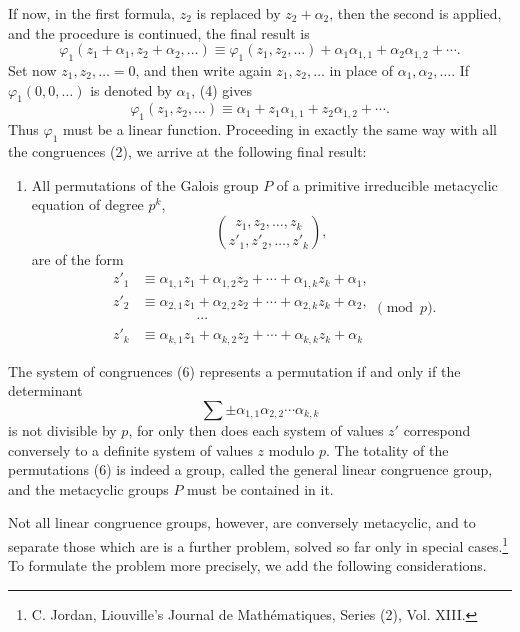 \documentclass[11pt]{article}
\begin{document}
If now, in the first formula, $z_2$ is replaced by $z_2+\alpha_2$, then the second is applied, and the procedure is continued, the final result is
\begin{equation}
 \varphi_1(z_1+\alpha_1,z_2+\alpha_2,\ldots)
 \equiv
 \varphi_1(z_1,z_2,\ldots)+\alpha_1\alpha_{1,1}
      +\alpha_2\alpha_{1,2}+\cdots .
 \tag{4}
\end{equation}
Set now $z_1,z_2,\ldots=0$, and then write again $z_1,z_2,\ldots$ in place of $\alpha_1,\alpha_2,\ldots$. If $\varphi_1(0,0,\ldots)$ is denoted by $\alpha_1$, (4) gives
\begin{equation}
 \varphi_1(z_1,z_2,\ldots)
 \equiv
 \alpha_1+z_1\alpha_{1,1}+z_2\alpha_{1,2}+\cdots.
 \tag{5}
\end{equation}
Thus $\varphi_1$ must be a linear function. Proceeding in exactly the same way with all the congruences (2), we arrive at the following final result:

\begin{enumerate}[label=\Roman*.,leftmargin=2.8em]
\item All permutations of the Galois group $P$ of a primitive irreducible metacyclic equation of degree $p^k$,
\[
 \binom{z_1,z_2,\ldots,z_k}{z'_1,z'_2,\ldots,z'_k},
\]
are of the form
\begin{equation}
\begin{aligned}
 z'_1&\equiv \alpha_{1,1}z_1+\alpha_{1,2}z_2+\cdots+\alpha_{1,k}z_k+\alpha_1,\\
 z'_2&\equiv \alpha_{2,1}z_1+\alpha_{2,2}z_2+\cdots+\alpha_{2,k}z_k+\alpha_2,\\
 &\hspace{4em}\cdots\\
 z'_k&\equiv \alpha_{k,1}z_1+\alpha_{k,2}z_2+\cdots+\alpha_{k,k}z_k+\alpha_k
\end{aligned}
\pmod p .
 \tag{6}
\end{equation}
\end{enumerate}

The system of congruences (6) represents a permutation if and only if the determinant
\[
 \sum \pm\alpha_{1,1}\alpha_{2,2}\cdots\alpha_{k,k}
\]
is not divisible by $p$, for only then does each system of values $z'$ correspond conversely to a definite system of values $z$ modulo $p$. The totality of the permutations (6) is indeed a group, called the general linear congruence group, and the metacyclic groups $P$ must be contained in it.

Not all linear congruence groups, however, are conversely metacyclic, and to separate those which are is a further problem, solved so far only in special cases.\footnote{C. Jordan, Liouville's Journal de Mathématiques, Series (2), Vol. XIII.} To formulate the problem more precisely, we add the following considerations.
\end{document}
